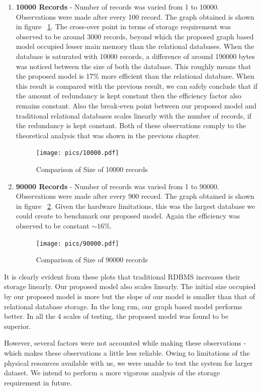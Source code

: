 \documentclass[12pt, oneside]{book}
\begin{document}
\begin{enumerate}
  \item \textbf{10000 Records} - Number of records was varied from 1 to 10000. Observations were made after every 100 record. The graph obtained is shown in figure ~\ref{fig:10000result}. The cross-over point in terms of storage requirement was observed to be around 3000 records, beyond which the proposed graph based model occupied lesser main memory than the relational databases. When the database is saturated with 10000 records, a difference of around 190000 bytes was noticed between the size of both the database. This roughly means that the proposed model is 17\% more efficient than the relational database. When this result is compared with the previous result, we can safely conclude that if the amount of redundancy is kept constant then the efficiency factor also remains constant. Also the break-even point between our proposed model and traditional relational databases scales linearly with the number of records, if the redundancy is kept constant. Both of these observations comply to the theoretical analysis that was shown in the previous chapter.
 \begin{figure}[H]
  \begin{center}
   \texttt{[image: pics/10000.pdf]}
   \caption{Comparison of Size of 10000 records}
   \label{fig:10000result}
  \end{center}
 \end{figure}
 \item \textbf{90000 Records} - Number of records was varied from 1 to 90000. Observations were made after every 900 record. The graph obtained is shown in figure ~\ref{fig:90000result}. Given the hardware limitations, this was the largest database we could create to benchmark our proposed model. Again the efficiency was observed to be constant $\sim16\%$.
 \begin{figure}[ht]
  \begin{center}
   \texttt{[image: pics/90000.pdf]}
   \caption{Comparison of Size of 90000 records}
   \label{fig:90000result}
  \end{center}
 \end{figure}
\end{enumerate}
\par
It is clearly evident from these plots that traditional RDBMS increases their storage linearly. Our proposed model also scales linearly. The initial size occupied by our proposed model is more but the slope of our model is smaller than that of relational database storage. In the long run, our graph based model performs better. In all the 4 scales of testing, the proposed model was found to be superior. \par 
However, several factors were not accounted while making these observations - which makes these observations a little less reliable. Owing to limitations of the physical resources available with us, we were unable to test the system for larger dataset. We intend to perform a more vigorous analysis of the storage requirement in future.
\end{document}
